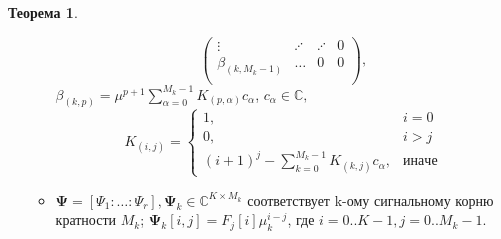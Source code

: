 \documentclass[specialist, substylefile = spbureport.rtx, subf,href,colorlinks=true, 12pt]{disser}
\theoremstyle{definition}
\newtheorem{theorem}{Теорема}
\begin{document}
\begin{theorem}
\begin{enumerate}
\begin{itemize}
\begin{equation*}
\begin{pmatrix}
                    \vdots & \iddots & \iddots & 0 \\
                    \beta _{(k, M_k - 1)} & \ldots & 0 & 0 \\
                    \end{pmatrix},
            \end{equation*}
            $\beta_{(k, p)} = \mu^{p + 1} \sum_{\alpha = 0}^{M_k - 1}K_{(p, \alpha)}c_{\alpha}$, $c_{\alpha} \in \mathbb{C},$
            \begin{equation*}
                K_{(i, j)} = \begin{cases}
                1, & i = 0 \\
                0, & i > j \\
                (i + 1)^j - \sum_{k = 0}^{M_k - 1}K_{(k, j)}c_{\alpha}, & иначе
                \end{cases}
            \end{equation*}
            
            \item $\mathbf{\Psi} = [\Psi_1: \ldots :\Psi_r], \mathbf{\Psi}_k \in \mathbb{C}^{K \times M_k}$ соответствует k-ому сигнальному корню кратности $M_k$; $\mathbf{\Psi}_k[i, j] = F_j[i]\mu_k^{i - j}$, где $i = 0..K-1, j = 0..M_k-1$.
        \end{itemize}
    \end{enumerate}

\end{theorem}
\end{document}
